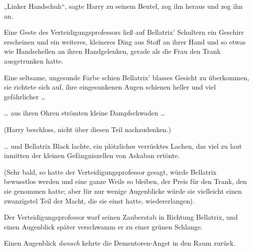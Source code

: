 „Linker Handschuh“, sagte Harry zu seinem Beutel, zog ihn heraus und zog ihn an.

Eine Geste des Verteidigungsprofessors ließ auf Bellatrix’ Schultern ein Geschirr erscheinen und ein weiteres, kleineres Ding aus Stoff an ihrer Hand und so etwas wie Handschellen an ihren Handgelenken, gerade als die Frau den Trank ausgetrunken hatte.

Eine seltsame, ungesunde Farbe schien Bellatrix’ blasses Gesicht zu überkommen, sie richtete sich auf, ihre eingesunkenen Augen schienen heller und viel gefährlicher …

… aus ihren Ohren strömten kleine Dampfschwaden …

(Harry beschloss, nicht über diesen Teil nachzudenken.)

… und Bellatrix Black lachte, ein plötzliches verrücktes Lachen, das viel zu laut inmitten der kleinen Gefängniszellen von Askaban ertönte.

(Sehr bald, so hatte der Verteidigungsprofessor gesagt, würde Bellatrix bewusstlos werden und eine ganze Weile so bleiben, der Preis für den Trank, den sie genommen hatte; aber für nur wenige Augenblicke würde sie vielleicht einen zwanzigstel Teil der Macht, die sie einst hatte, wiedererlangen).

Der Verteidigungsprofessor warf seinen Zauberstab in Richtung Bellatrix, und einen Augenblick später verschwamm er zu einer grünen Schlange.

Einen Augenblick \emph{danach} kehrte die Dementoren-Angst in den Raum zurück.

